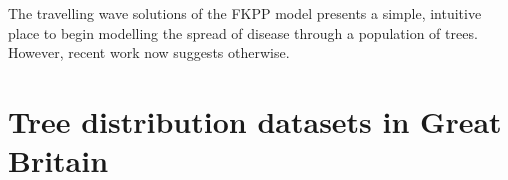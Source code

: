 The travelling wave solutions of the FKPP model presents a simple, intuitive place to begin modelling the spread of disease 
through a population of trees. However, recent work now suggests otherwise.  













\newpage

\section{Tree distribution datasets in Great Britain}
\label{ch2:hostdata}

